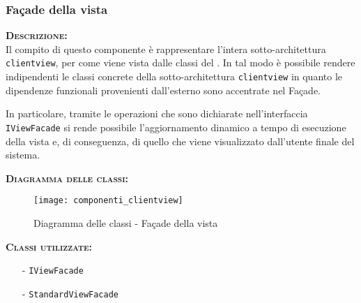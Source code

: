 \subsubsection{Façade della vista}
\begin{description}
	\item{\scshape\bfseries Descrizione:}\\
Il compito di questo componente è rappresentare l'intera sotto-architettura \texttt{clientview}, per come viene vista dalle classi del . In tal modo è possibile rendere indipendenti le classi concrete della sotto-architettura \texttt{clientview} in quanto le dipendenze funzionali provenienti dall'esterno sono accentrate nel Façade.

In particolare, tramite le operazioni che sono dichiarate nell'interfaccia \texttt{IViewFacade} si rende possibile l'aggiornamento dinamico a tempo di esecuzione della vista e, di conseguenza, di quello che viene visualizzato dall'utente finale del sistema.
	\item{\scshape\bfseries Diagramma delle classi:}
\begin{figure}[H]
\begin{center}
\texttt{[image: componenti\_clientview]}
\caption{Diagramma delle classi - Façade della vista}\label{fig:facade_vista}
\end{center}
\end{figure}
	\item{\scshape\bfseries Classi utilizzate:} 
	\begin{itemize}[noitemsep,nolistsep]
		\item[-] \texttt{IViewFacade}
		\item[-] \texttt{StandardViewFacade}
	\end{itemize}  
\end{description}

